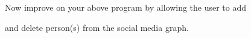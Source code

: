 Now improve on your above program by allowing the user to add

and delete person(s) from the social media graph.


